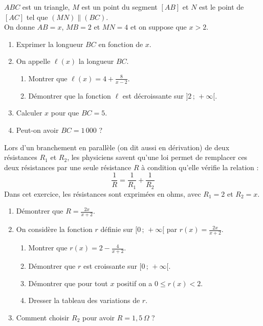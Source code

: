\begin{prob}
$ABC$ est un triangle, $M$ est un point du segment $[AB]$ et $N$ est le point de $[AC]$ tel que $(MN)\parallel(BC)$.\\
On donne $AB=x$, $MB=2$ et $MN=4$ et on suppose que $x>2$.
\begin{enumerate}
 \item Exprimer la longueur $BC$ en fonction de $x$.
 \item On appelle $\ell(x)$ la longueur $BC$.
       \begin{enumerate}
        \item Montrer que $\ell(x)=4+\frac{8}{x-2}$.
	\item D\'emontrer que la fonction $\ell$ est d\'ecroissante sur $]2\,;\,+\infty[$.
       \end{enumerate}
 \item Calculer $x$ pour que $BC=5$.
 \item Peut-on avoir $BC=1\,000$ ?
\end{enumerate}
\end{prob}

\begin{prob}
 Lors d'un branchement en parall\`ele (on dit aussi en d\'erivation) de deux r\'esistances $R_1$ et $R_2$, les physiciens savent qu'une loi permet de remplacer ces deux r\'esistances par une seule r\'esistance $R$ \`a condition qu'elle v\'erifie la relation :
 \[\frac{1}{R}=\frac{1}{R_1}+\frac{1}{R_2}\]
 Dans cet exercice, les r\'esistances sont exprim\'ees en ohms, avec $R_1=2$ et $R_2=x$.
\begin{enumerate}
 \item D\'emontrer que $R=\frac{2x}{x+2}$.
 \item On consid\`ere la fonction $r$ d\'efinie sur $[0\,;\,+\infty[$ par $r(x)=\frac{2x}{x+2}$.
	\begin{enumerate}
	 \item Montrer que $r(x)=2-\frac{4}{x+2}$.
	 \item D\'emontrer que $r$ est croissante sur $[0\,;\,+\infty[$.
	 \item D\'emontrer que pour tout $x$ positif on a $0\leqslant r(x) <2$.
	 \item Dresser la tableau des variations de $r$.
	\end{enumerate}
 \item Comment choisir $R_2$ pour avoir $R=1,5\,\Omega$ ?
\end{enumerate}

\end{prob}

